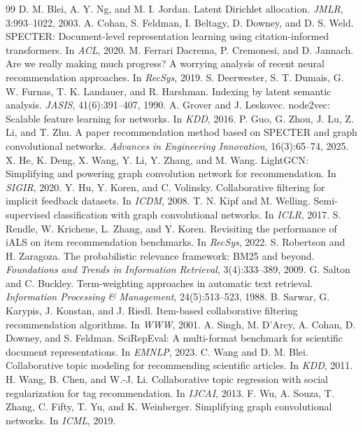 \documentclass[10pt]{article}
\begin{document}
\begin{thebibliography}{99}\small
{} D. M. Blei, A. Y. Ng, and M. I. Jordan. Latent Dirichlet allocation. \emph{JMLR}, 3:993--1022, 2003.
 A. Cohan, S. Feldman, I. Beltagy, D. Downey, and D. S. Weld. SPECTER: Document-level representation learning using citation-informed transformers. In \emph{ACL}, 2020.
 M. Ferrari Dacrema, P. Cremonesi, and D. Jannach. Are we really making much progress? A worrying analysis of recent neural recommendation approaches. In \emph{RecSys}, 2019.
 S. Deerwester, S. T. Dumais, G. W. Furnas, T. K. Landauer, and R. Harshman. Indexing by latent semantic analysis. \emph{JASIS}, 41(6):391--407, 1990.
 A. Grover and J. Leskovec. node2vec: Scalable feature learning for networks. In \emph{KDD}, 2016.
 P. Guo, G. Zhou, J. Lu, Z. Li, and T. Zhu. A paper recommendation method based on SPECTER and graph convolutional networks. \emph{Advances in Engineering Innovation}, 16(3):65--74, 2025.
 X. He, K. Deng, X. Wang, Y. Li, Y. Zhang, and M. Wang. LightGCN: Simplifying and powering graph convolution network for recommendation. In \emph{SIGIR}, 2020.
 Y. Hu, Y. Koren, and C. Volinsky. Collaborative filtering for implicit feedback datasets. In \emph{ICDM}, 2008.
 T. N. Kipf and M. Welling. Semi-supervised classification with graph convolutional networks. In \emph{ICLR}, 2017.
 S. Rendle, W. Krichene, L. Zhang, and Y. Koren. Revisiting the performance of iALS on item recommendation benchmarks. In \emph{RecSys}, 2022.
 S. Robertson and H. Zaragoza. The probabilistic relevance framework: BM25 and beyond. \emph{Foundations and Trends in Information Retrieval}, 3(4):333--389, 2009.
 G. Salton and C. Buckley. Term-weighting approaches in automatic text retrieval. \emph{Information Processing \& Management}, 24(5):513--523, 1988.
 B. Sarwar, G. Karypis, J. Konstan, and J. Riedl. Item-based collaborative filtering recommendation algorithms. In \emph{WWW}, 2001.
 A. Singh, M. D'Arcy, A. Cohan, D. Downey, and S. Feldman. SciRepEval: A multi-format benchmark for scientific document representations. In \emph{EMNLP}, 2023.
 C. Wang and D. M. Blei. Collaborative topic modeling for recommending scientific articles. In \emph{KDD}, 2011.
 H. Wang, B. Chen, and W.-J. Li. Collaborative topic regression with social regularization for tag recommendation. In \emph{IJCAI}, 2013.
 F. Wu, A. Souza, T. Zhang, C. Fifty, T. Yu, and K. Weinberger. Simplifying graph convolutional networks. In \emph{ICML}, 2019.
\end{thebibliography}
\end{document}
